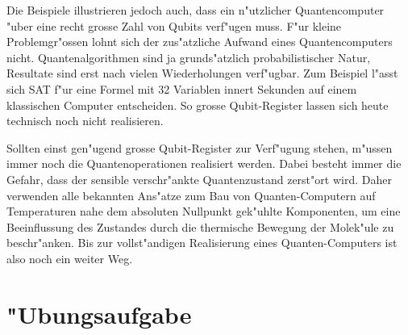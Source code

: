 Die Beispiele illustrieren jedoch auch, dass ein n"utzlicher
Quantencomputer "uber eine recht grosse Zahl von Qubits verf"ugen
muss.
F"ur kleine Problemgr"ossen lohnt sich der zus"atzliche Aufwand
eines Quantencomputers nicht.
Quantenalgorithmen sind ja grunds"atzlich probabilistischer
Natur, Resultate sind erst nach vielen Wiederholungen verf"ugbar.
Zum Beispiel l"asst sich SAT f"ur eine Formel mit 32 Variablen
innert Sekunden auf einem klassischen Computer entscheiden.
So grosse Qubit-Register lassen sich heute technisch noch nicht
realisieren.

Sollten einst gen"ugend grosse Qubit-Register zur Verf"ugung
stehen, m"ussen immer noch die Quantenoperationen realisiert
werden.
Dabei besteht immer die Gefahr, dass der sensible verschr"ankte
Quantenzustand zerst"ort wird.
Daher verwenden alle bekannten Ans"atze zum Bau von
Quanten-Computern auf Temperaturen nahe dem absoluten
Nullpunkt gek"uhlte Komponenten, um eine Beeinflussung des
Zustandes durch die thermische Bewegung der Molek"ule
zu beschr"anken.
Bis zur vollst"andigen Realisierung eines Quanten-Computers
ist also noch ein weiter Weg.

\section*{"Ubungsaufgabe}
\begin{uebungsaufgaben}
\item

\end{uebungsaufgaben}
